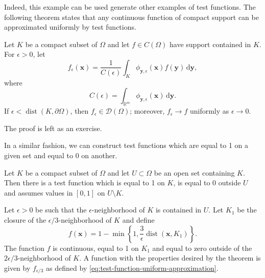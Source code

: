 Indeed, this example can be used generate other examples of test functions. The following theorem states that any continuous function of compact support can be approximated uniformly by test functions.

\begin{Theorem}
\label{thm:test-functions-uniform-approximation}
Let $K$ be a compact subset of $\Omega$ and let $f\in C(\Omega)$ have support contained in $K$. For $\epsilon>0$, let
\begin{equation}\label{eq:test-function-uniform-approximation}
f_\epsilon(\bm{x})=\dfrac1{C(\epsilon)}\int_K\phi_{\bm{y},\epsilon}(\bm{x})f(\bm{y})\,\mathrm{d}\bm{y},
\end{equation}
where
\begin{equation}\label{eq:test-function-bump-normalization}
C(\epsilon)=\int_{\mathbb{R}^m}\phi_{\bm{y},\epsilon}(\bm{x})\,\mathrm{d}\bm{y}.
\end{equation}
If $\epsilon<\operatorname{dist}(K,\partial\Omega)$, then $f_\epsilon\in\mathcal{D}(\Omega)$; moreover, $f_\epsilon\to f$ uniformly as $\epsilon\to0$.
\end{Theorem}

The proof is left as an exercise.

In a similar fashion, we can construct test functions which are equal to 1 on a given set and equal to 0 on another.

\begin{Theorem}
\label{thm:smooth-cutoff}
Let $K$ be a compact subset of $\Omega$ and let $U\subset\Omega$ be an open set containing $K$. Then there is a test function which is equal to 1 on $K$, is equal to 0 outside $U$ and assumes values in $[0,1]$ on $U\setminus K$.
\end{Theorem}

\begin{Proof}
Let $\epsilon>0$ be such that the $\epsilon$-neighborhood of $K$ is contained in $U$. Let $K_1$ be the closure of the $\epsilon/3$-neighborhood of $K$ and define
\begin{equation}\label{eq:continuous-neighborhood-cutoff}
f(\bm{x})=1-\min\left\{1,\dfrac3\epsilon\operatorname{dist}(\bm{x},K_1)\right\}.
\end{equation}
The function $f$ is continuous, equal to 1 on $K_1$ and equal to zero outside of the $2\epsilon/3$-neighborhood of $K$. A function with the properties desired by the theorem is given by $f_{\epsilon/3}$ as defined by \eqref{eq:test-function-uniform-approximation}.
\end{Proof}

